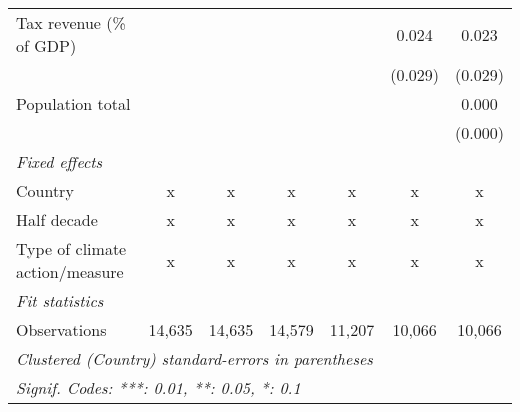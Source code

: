 \begin{tabular}{lcccccc}
   Tax revenue (\% of GDP)                                      &         &         &         &         & 0.024   & 0.023\\   
                                                                &         &         &         &         & (0.029) & (0.029)\\   
   Population total                                             &         &         &         &         &         & 0.000\\   
                                                                &         &         &         &         &         & (0.000)\\   
   \emph{Fixed effects}\\
   Country                                                      & x       & x       & x       & x       & x       & x\\  
   Half decade                                                  & x       & x       & x       & x       & x       & x\\  
   Type of climate action/measure                               & x       & x       & x       & x       & x       & x\\  
   \midrule \emph{Fit statistics}\\
   Observations                                                 & 14,635  & 14,635  & 14,579  & 11,207  & 10,066  & 10,066\\  
   \midrule
   \multicolumn{7}{l}{\emph{Clustered (Country) standard-errors in parentheses}}\\
   \multicolumn{7}{l}{\emph{Signif. Codes: ***: 0.01, **: 0.05, *: 0.1}}\\
\end{tabular}
\par\endgroup


